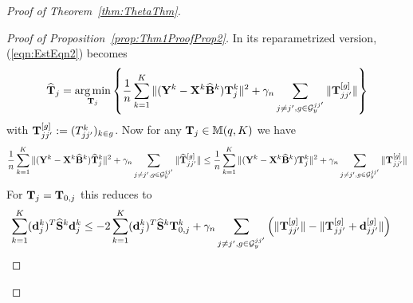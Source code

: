\documentclass[12pt, letterpaper]{article}
\DeclareMathOperator*{\argmin}{arg\,min}
\numberwithin{equation}{section}
\begin{document}
\begin{proof}[Proof of Theorem~\ref{thm:ThetaThm}]
\begin{proof}[Proof of Proposition~\ref{prop:Thm1ProofProp2}]
In its reparametrized version, (\ref{eqn:EstEqn2}) becomes
%
\begin{align}
\widehat \bfT_j = \argmin_{\bfT_j} \left\{ \frac{1}{n} \sum_{k=1}^K \| (\bfY^k - \bfX^k \widehat \bfB^k) \bfT_j^k \|^2 + \gamma_n \sum_{j \neq j', g \in \cG_y^{jj'}} \| \bfT_{jj'}^{[g]} \| \right\}
\end{align}
%
with ${\mathbf{T}}_{jj'}^{[g]} := (T_{jj'}^k)_{k \in g}$. Now for any ${\mathbf{T}}_j \in {\mathbb{M}}(q, K)$ we have
%
$$
\frac{1}{n} \sum_{k=1}^K \| ({\mathbf{Y}}^k - {\mathbf{X}}^k \widehat {{\mathbf{B}}}^k) \widehat {{\mathbf{T}}}_j^k \|^2 + \gamma_n \sum_{j \neq j', g \in {\cal{G}}_y^{jj'}} \| \widehat {{\mathbf{T}}}_{jj'}^{[g]} \| \leq
\frac{1}{n} \sum_{k=1}^K \| ({\mathbf{Y}}^k - {\mathbf{X}}^k \widehat {{\mathbf{B}}}^k) {\mathbf{T}}_j^k \|^2 + \gamma_n \sum_{j \neq j', g \in {\cal{G}}_y^{jj'}} \| {\mathbf{T}}_{jj'}^{[g]} \|
$$
%
For ${\mathbf{T}}_j = {\mathbf{T}}_{0,j}$ this reduces to
%
\begin{align}\label{eqn::Thm1ProofProp2Eqn1}
\sum_{k=1}^K ({\bf{d}}_j^k)^T \widehat {{\mathbf{S}}}^k {\bf{d}}_j^k & \leq - 2 \sum_{k=1}^K ({\bf{d}}_j^k)^T \widehat {{\mathbf{S}}}^k {\mathbf{T}}_{0,j}^k + \gamma_n \sum_{j \neq j', g \in {\cal{G}}_y^{jj'}} \left( \| {\mathbf{T}}_{jj'}^{[g]} \| -  \| {\mathbf{T}}_{jj'}^{[g]} + {\bf{d}}_{jj'}^{[g]}\| \right)
\end{align}


\end{proof}
\end{proof}
\end{document}
